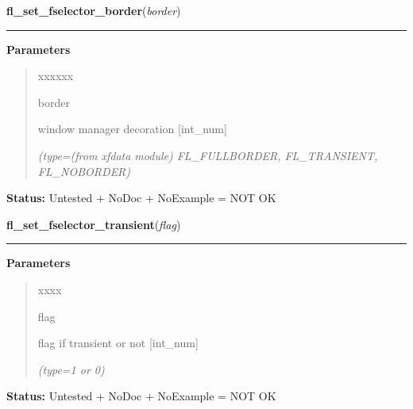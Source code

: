 \hspace{.8\funcindent}\begin{boxedminipage}{\funcwidth}

    \raggedright \textbf{fl\_set\_fselector\_border}(\textit{border})

    \vspace{-1.5ex}

    \rule{\textwidth}{0.5\fboxrule}
\setlength{\parskip}{2ex}
\setlength{\parskip}{1ex}
      \textbf{Parameters}
      \vspace{-1ex}

      \begin{quote}
        \begin{Ventry}{xxxxxx}

          \item[border]

          window manager decoration [int\_num]

            {\it (type=(from xfdata module) FL\_FULLBORDER, FL\_TRANSIENT, FL\_NOBORDER)}

        \end{Ventry}

      \end{quote}

\textbf{Status:} Untested + NoDoc + NoExample = NOT OK



    \end{boxedminipage}

    \label{xformslib:library:fl_set_fselector_transient}

    \vspace{0.5ex}

\hspace{.8\funcindent}\begin{boxedminipage}{\funcwidth}

    \raggedright \textbf{fl\_set\_fselector\_transient}(\textit{flag})

    \vspace{-1.5ex}

    \rule{\textwidth}{0.5\fboxrule}
\setlength{\parskip}{2ex}
\setlength{\parskip}{1ex}
      \textbf{Parameters}
      \vspace{-1ex}

      \begin{quote}
        \begin{Ventry}{xxxx}

          \item[flag]

          flag if transient or not [int\_num]

            {\it (type=1 or 0)}

        \end{Ventry}

      \end{quote}

\textbf{Status:} Untested + NoDoc + NoExample = NOT OK



    \end{boxedminipage}

